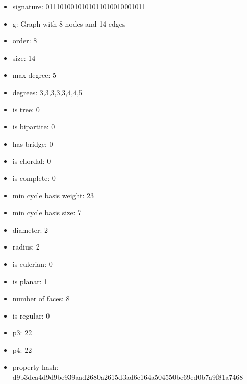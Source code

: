 \begin{itemize}
\item signature: 0111010010101011010010001011
\item g: Graph with 8 nodes and 14 edges
\item order: 8
\item size: 14
\item max degree: 5
\item degrees: 3,3,3,3,3,4,4,5
\item is tree: 0
\item is bipartite: 0
\item has bridge: 0
\item is chordal: 0
\item is complete: 0
\item min cycle basis weight: 23
\item min cycle basis size: 7
\item diameter: 2
\item radius: 2
\item is eulerian: 0
\item is planar: 1
\item number of faces: 8
\item is regular: 0
\item p3: 22
\item p4: 22
\item property hash: d9b3dca4d9d9be939aad2680a2615d3ad6e164a504550be69ed0b7a9f81a7468
\end{itemize}
\newpage
\begin{figure}
\end{figure}
